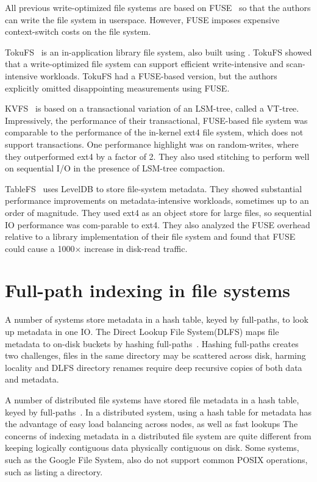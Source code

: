 All previous write-optimized file systems are based on FUSE~\citep{fuse} so that
the authors can write the file system in userspace.
However, FUSE imposes expensive context-switch costs on the file system.

TokuFS~\citep{tokufs} is an in-application library file system, also built using
\bets.
TokuFS showed that a write-optimized file system can support efficient
write-intensive and scan-intensive workloads.
TokuFS had a FUSE-based version, but the authors explicitly omitted
disappointing measurements using FUSE.

KVFS~\citep{kvfs} is based on a transactional variation of an LSM-tree, called a
VT-tree.
Impressively, the performance of their transactional, FUSE-based file system was
comparable to the performance of the in-kernel ext4 file system,
which does not support transactions.
One performance highlight was on random-writes, where they outperformed ext4 by
a factor of 2.
They also used stitching to perform well on sequential I/O in the presence of
LSM-tree compaction.

TableFS~\citep{tablefs} uses LevelDB to store file-system metadata.
They showed substantial performance improvements on metadata-intensive
workloads, sometimes up to an order of magnitude.
They used ext4 as an object store for large files, so sequential IO performance
was com-parable to ext4.
They also analyzed the FUSE overhead relative to a library implementation of
their file system and found that FUSE could cause a 1000× increase in disk-read
traffic.

\section{Full-path indexing in file systems}
A number of systems store metadata in a hash table, keyed by full-paths, to look
up metadata in one IO.
The Direct Lookup File System(DLFS) maps file metadata to on-disk buckets by
hashing full-paths~\citep{dlfs}.
Hashing full-paths creates two challenges, files in the same directory may be
scattered across disk, harming locality and DLFS directory renames require deep
recursive copies of both data and metadata.

A number of distributed file systems have stored file metadata in a hash table,
keyed by full-paths~\citep{gfs,nsidw,rdfs}.
In a distributed system, using a hash table for metadata has the advantage of
easy load balancing across nodes, as well as fast lookups
The concerns of indexing metadata in a distributed file system are quite
different from keeping logically contiguous data physically contiguous on disk.
Some systems, such as the Google File System, also do not support common POSIX
operations, such as listing a directory.

